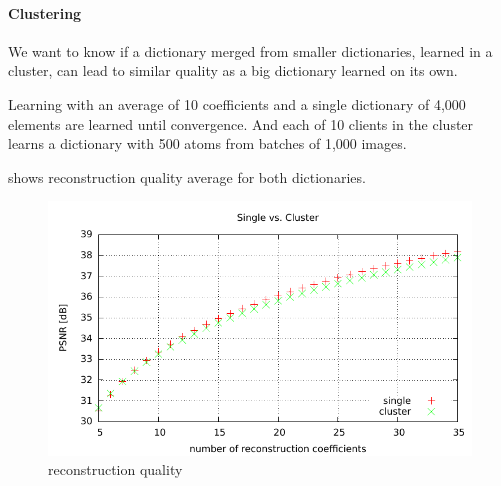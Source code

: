 


\paragraph{Clustering}
We want to know if a dictionary merged from smaller dictionaries, learned in a
cluster, can lead to similar quality as a big dictionary learned on its own.

Learning with an average of 10 coefficients and a single dictionary of 4,000
elements are learned until convergence. And each of 10 clients in the cluster
learns a dictionary with 500 atoms from batches of 1,000 images. 

 shows reconstruction quality average for both
dictionaries.


\begin{figure}[H]
\centering
\includegraphics[width = 1.0\textwidth]{../tests/results/coeffsConvergInc.pdf}
\caption{reconstruction quality}
\label{fig:coeffsConvergInc}
\end{figure}

